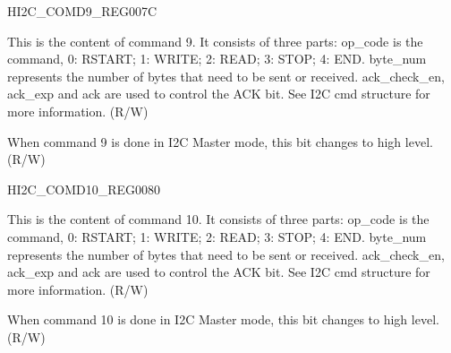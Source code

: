 \begin{register}{H}{I2C\_COMD9\_REG}{\hexprefix{}007C}\label{regdesc:I2CCOMD9REG}
%
%
%
\regnewline%
\begin{regdesc}\begin{reglist}
\label{fielddesc:I2CCOMMAND9}\item [I2C\_COMMAND9] This is the content of command 9. It consists of three parts:
op\_code is the command, 0: RSTART; 1: WRITE; 2: READ; 3: STOP; 4: END.
byte\_num represents the number of bytes that need to be sent or received.
ack\_check\_en, ack\_exp and ack are used to control the ACK bit. See I2C cmd structure for more information. (R/W)
\label{fielddesc:I2CCOMMAND9DONE}\item [I2C\_COMMAND9\_DONE] When command 9 is done in I2C Master mode, this bit changes to high level. (R/W)
\end{reglist}\end{regdesc}
\end{register}


\begin{register}{H}{I2C\_COMD10\_REG}{\hexprefix{}0080}\label{regdesc:I2CCOMD10REG}
%
%
%
\regnewline%
\begin{regdesc}\begin{reglist}
\label{fielddesc:I2CCOMMAND10}\item [I2C\_COMMAND10] This is the content of command 10. It consists of three parts:
op\_code is the command, 0: RSTART; 1: WRITE; 2: READ; 3: STOP; 4: END.
byte\_num represents the number of bytes that need to be sent or received.
ack\_check\_en, ack\_exp and ack are used to control the ACK bit. See I2C cmd structure for more information. (R/W)
\label{fielddesc:I2CCOMMAND10DONE}\item [I2C\_COMMAND10\_DONE] When command 10 is done in I2C Master mode, this bit changes to high level. (R/W)
\end{reglist}\end{regdesc}
\end{register}


